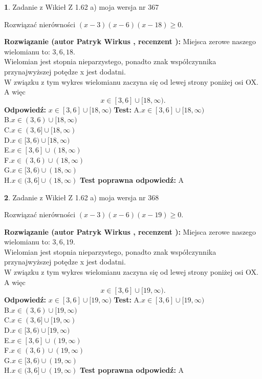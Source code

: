 \documentclass[12pt, a4paper]{article}
\theoremstyle{definition} %
\newtheorem{zad}{}
\newcommand{\zadStart}[1]{\begin{zad}#1\newline}
\newcommand{\zadStop}{\end{zad}}
\newcommand{\rozwStart}[2]{\noindent \textbf{Rozwiązanie (autor #1 , recenzent #2): }\newline}
\newcommand{\rozwStop}{\newline}
\newcommand{\odpStart}{\noindent \textbf{Odpowiedź:}\newline}
\newcommand{\odpStop}{\newline}
\newcommand{\testStart}{\noindent \textbf{Test:}\newline}
\newcommand{\testStop}{\newline}
\newcommand{\kluczStart}{\noindent \textbf{Test poprawna odpowiedź:}\newline}
\newcommand{\kluczStop}{\newline}
\begin{document}
\zadStart{Zadanie z Wikieł Z 1.62 a) moja wersja nr 367}

Rozwiązać nierówności $(x-3)(x-6)(x-18)\ge0$.
\zadStop
\rozwStart{Patryk Wirkus}{}
Miejsca zerowe naszego wielomianu to: $3, 6, 18$.\\
Wielomian jest stopnia nieparzystego, ponadto znak współczynnika przy\linebreak najwyższej potędze x jest dodatni.\\ W związku z tym wykres wielomianu zaczyna się od lewej strony poniżej osi OX. A więc $$x \in [3,6] \cup [18,\infty).$$
\rozwStop
\odpStart
$x \in [3,6] \cup [18,\infty)$
\odpStop
\testStart
A.$x \in [3,6] \cup [18,\infty)$\\
B.$x \in (3,6) \cup [18,\infty)$\\
C.$x \in (3,6] \cup [18,\infty)$\\
D.$x \in [3,6) \cup [18,\infty)$\\
E.$x \in [3,6] \cup (18,\infty)$\\
F.$x \in (3,6) \cup (18,\infty)$\\
G.$x \in [3,6) \cup (18,\infty)$\\
H.$x \in (3,6] \cup (18,\infty)$
\testStop
\kluczStart
A
\kluczStop



\zadStart{Zadanie z Wikieł Z 1.62 a) moja wersja nr 368}

Rozwiązać nierówności $(x-3)(x-6)(x-19)\ge0$.
\zadStop
\rozwStart{Patryk Wirkus}{}
Miejsca zerowe naszego wielomianu to: $3, 6, 19$.\\
Wielomian jest stopnia nieparzystego, ponadto znak współczynnika przy\linebreak najwyższej potędze x jest dodatni.\\ W związku z tym wykres wielomianu zaczyna się od lewej strony poniżej osi OX. A więc $$x \in [3,6] \cup [19,\infty).$$
\rozwStop
\odpStart
$x \in [3,6] \cup [19,\infty)$
\odpStop
\testStart
A.$x \in [3,6] \cup [19,\infty)$\\
B.$x \in (3,6) \cup [19,\infty)$\\
C.$x \in (3,6] \cup [19,\infty)$\\
D.$x \in [3,6) \cup [19,\infty)$\\
E.$x \in [3,6] \cup (19,\infty)$\\
F.$x \in (3,6) \cup (19,\infty)$\\
G.$x \in [3,6) \cup (19,\infty)$\\
H.$x \in (3,6] \cup (19,\infty)$
\testStop
\kluczStart
A
\kluczStop
\end{document}
